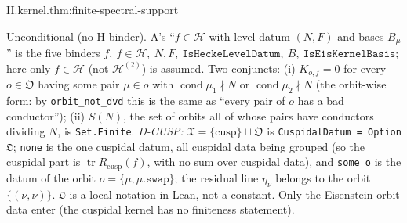 \begin{tfformal}{II.kernel.thm:finite-spectral-support}
\begin{tffidelity}
Unconditional (no H binder). A's ``$f\in\mathcal H$ with level datum $(N,F)$ and bases $B_\mu$'' is the five binders $f,\ f\in\mathcal H,\ N,F,\ \texttt{IsHeckeLevelDatum},\ B,\ \texttt{IsEisKernelBasis}$; here only $f\in\mathcal H$ (not $\mathcal H^{(2)}$) is assumed. Two conjuncts: (i) $K_{o,f}=0$ for every $o\in\mathfrak O$ having some pair $\mu\in o$ with $\operatorname{cond}\mu_1\nmid N$ or $\operatorname{cond}\mu_2\nmid N$ (the orbit-wise form: by \texttt{orbit\_not\_dvd} this is the same as ``every pair of $o$ has a bad conductor''); (ii) $S(N)$, the set of orbits all of whose pairs have conductors dividing $N$, is \texttt{Set.Finite}. \emph{D-CUSP:} $\mathfrak X=\{\mathrm{cusp}\}\sqcup\mathfrak O$ is \texttt{CuspidalDatum = Option 𝔒}; \texttt{none} is the one cuspidal datum, all cuspidal data being grouped (so the cuspidal part is $\operatorname{tr}R_{\mathrm{cusp}}(f)$, with no sum over cuspidal data), and \texttt{some o} is the datum of the orbit $o=\{\mu,\mu.\texttt{swap}\}$; the residual line $\eta_\nu$ belongs to the orbit $\{(\nu,\nu)\}$. \texttt{𝔒} is a local notation in Lean, not a constant. Only the Eisenstein-orbit data enter (the cuspidal kernel has no finiteness statement).
\end{tffidelity}
\end{tfformal}
